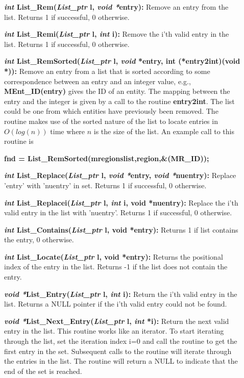\documentclass[12pt]{article}
\begin{document}
\begin{description}
\item[]{\bf {\em int} List\_Rem({\em List\_ptr} l, {\em void
  *}entry):} Remove an entry from the list. Returns 1 if successful, 0
otherwise.

\item[]{\bf {\em int} List\_Remi({\em List\_ptr} l, {\em int} i):}
Remove the i'th valid entry in the list. Returns 1 if successful, 0
otherwise.

\item[]{\bf {\em int} List\_RemSorted({\em List\_ptr} l, {\em void}
    *entry, int (*entry2int)(void *)):} Remove an entry from a list
  that is sorted according to some correspondence between an entry and
  an integer value, e.g., {\bf MEnt\_ID(entry)} gives the ID of an
  entity. The mapping between the entry and the integer is given by a
  call to the routine {\bf entry2int}. The list could be one from which
  entities have previously been removed. The routine makes use of the
  sorted nature of the list to locate entries in $O(log(n))$ time
  where $n$ is the size of the list. An example call to this routine
  is

  \par {\bf fnd = List\_RemSorted(mregionslist,region,\&(MR\_ID));} 

\item[]{\bf {\em int} List\_Replace({\em List\_ptr} l, {\em void
  *}entry, {\em void *}nuentry):} Replace 'entry' with 'nuentry' in
set. Returns 1 if successful, 0 otherwise.

\item[]{\bf {\em int} List\_Replacei({\em List\_ptr} l, {\em int}
i, void *nuentry):} Replace the i'th valid entry in the list with
'nuentry'. Returns 1 if successful, 0 otherwise.

\item[]{\bf {\em int} List\_Contains({\em List\_ptr} l, void *entry):}
Returns 1 if list contains the entry, 0 otherwise.

\item[]{\bf {\em int} List\_Locate({\em List\_ptr} l, void *entry):}
Returns the positional index of the entry in the list. Returns -1 if
the list does not contain the entry.

\item[]{\bf {\em void *}List\_Entry({\em List\_ptr} l, {\em int}
i):} Return the i'th valid entry in the list.  Returns a NULL pointer if
the i'th valid entry could not be found.

\item[]{\bf {\em void *}List\_Next\_Entry({\em List\_ptr} l,
{\em int} *i):} Return the next valid entry in the list. This routine
works like an iterator. To start iterating through the list, set the
iteration index i=0 and call the routine to get the first entry in the
set. Subsequent calls to the routine will iterate through the entries
in the list. The routine will return a NULL to indicate that the end of
the set is reached.


\end{description}
\end{document}
